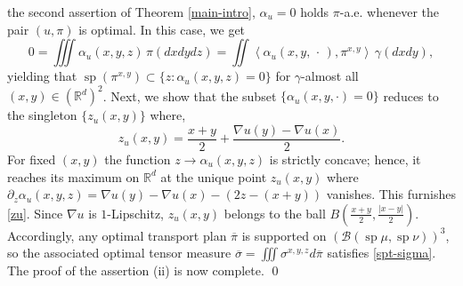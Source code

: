 \documentclass[11pt,letterpaper,reqno]{amsart}
\newtheorem{corollary}[theorem]{Corollary}
\theoremstyle{definition}
\numberwithin{equation}{section}
\newcommand{\med}{\medskip\noindent}
\newcommand{\R}{\mathbb{R}}
\newcommand{\Rd}{\R^d}
\newcommand{\ov}{\overline}
\newcommand{\B}{\mathcal{B}}
\newcommand{\argu}{{\,\cdot\,}}
\newcommand{\dive}{{\mathrm{div}}}
\newcommand{\pairing}[1]{{\left \langle #1 \right \rangle}}
\newcommand{\abs}[1]{{\left \lvert #1 \right \rvert}}
\DeclareMathOperator{\spt}{sp}
\begin{document}
{the second assertion of Theorem \ref{main-intro},    $\alpha_u=0$
holds $\pi$-a.e. whenever the pair $(u,\pi)$ is optimal.  In this case, we get
$$  0 = \iiint \alpha_u(x,y,z) \, \pi(dxdydz)  = \iint \pairing {\alpha_u(x,y,\argu),{\pi^{x,y}}} \, \gamma(dxdy) ,$$
yielding that $\spt( {\pi^{x,y}}) \subset \{z : \alpha_u(x,y,z)=0\}$ for $\gamma$-almost all $(x,y)\in (\R^d)^2$. 
Next, we show that the subset  $\{\alpha_u(x,y,\cdot)=0\}$ reduces to the singleton $\{z_u(x,y)\}$ where,
\begin{equation}\label{zu}
z_u(x,y) =  \frac{x+y}{2} + \frac{\nabla u(y)-\nabla  u(x)}{2} .
\end{equation}
 For fixed  $(x,y)$ the function $z\to \alpha_u(x,y,z)$ is strictly concave; hence, it reaches its maximum on $\R^d$ at the unique point $z_u(x,y)$ where  $\partial_z \alpha_u(x,y,z) = \nabla u (y) -\nabla u(x) - (2 z -(x+y))$ vanishes.
This furnishes \eqref{zu}. Since $\nabla u$ is $1$-Lipschitz, $z_u(x,y)$ belongs to the ball $B(\frac{x+y}{2},\frac{|x-y|}{2})$.
Accordingly,  any optimal transport plan $\ov\pi$ is supported on {$(\B(\spt \mu, \spt \nu))^3$},
so the associated optimal tensor measure $\ov \sigma = \iiint \sigma^{x,y,z} d\ov\pi$ satisfies   \eqref{spt-sigma}.
The proof of the assertion (ii) is now complete.  
\qed





%
%
%  
%
\bigskip
}
\end{document}
